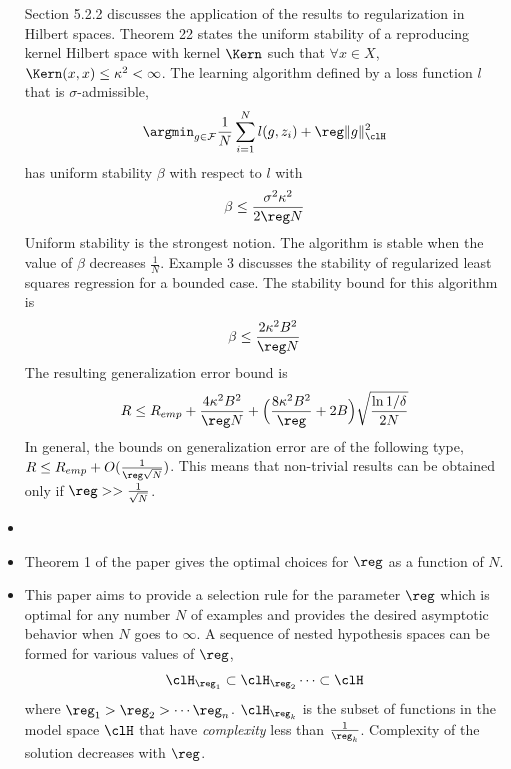 \begin{itemize}
Section 5.2.2 discusses the application of the results to regularization in Hilbert spaces. Theorem 22 states the uniform stability of a reproducing kernel Hilbert space with kernel $\Kern$ such that $\forall x \in X$, $\Kern(x,x) \leq \kappa^2 < \infty$. The learning algorithm defined by a loss function $l$ that is $\sigma$-admissible, 
\[
\argmin_{g \in \mathcal{F}} \frac{1}{N} \sum_{i=1}^N l(g,z_i) + \reg \|g\|^2_\clH
\]
has uniform stability $\beta$ with respect to $l$ with 
\[
\beta \leq \frac{\sigma^2 \kappa^2}{2 \reg N}
\]
Uniform stability is the strongest notion. The algorithm is stable when the value of $\beta$ decreases $\frac{1}{N}$.
Example 3 discusses the stability of regularized least squares regression for a bounded case. The stability bound for this algorithm is
\[
\beta \leq \frac{2\kappa^2 B^2}{\reg N}
\]
The resulting generalization error bound is 
\[
R \leq R_{emp} + \frac{4 \kappa^2 B^2}{\reg N} + \Bigl(\frac{8 \kappa^2 B^2}{\reg} + 2B \Bigr)\sqrt{\frac{\ln 1/\delta}{2N}}
\]
In general, the bounds on generalization error are of the following type, $ R \leq R_{emp} + O(\frac{1}{\reg \sqrt{N}})$. This means that non-trivial results can be obtained only if $\reg >> \frac{1}{\sqrt{N}}$.
\item {}

\item {}

Theorem 1 of the paper gives the optimal choices for $\reg$ as a function of $N$. 

\item {}

This paper aims to provide a selection rule for the parameter $\reg$ which is optimal for any number $N$ of examples and provides the desired asymptotic behavior when $N$ goes to $\infty$. A sequence of nested hypothesis spaces can be formed for various values of $\reg$,
\[
\clH_{\reg_1} \subset \clH_{\reg_2} \cdots \subset \clH
\]
where $\reg_1 > \reg_2 > \cdots \reg_n$. $\clH_{\reg_k}$ is the subset of functions in the model space $\clH$ that have \textit{complexity} less than $\frac{1}{\reg_k}$. Complexity of the solution decreases with $\reg$.  


\end{itemize}
